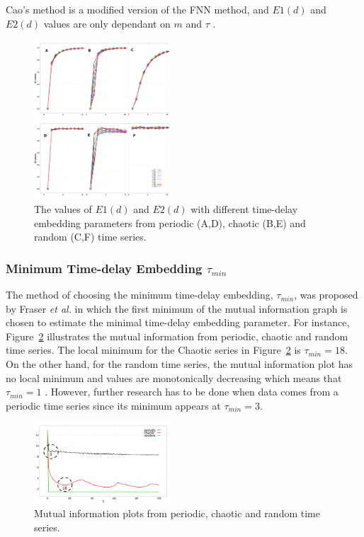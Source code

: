 \documentclass[10pt,journal,compsoc]{IEEEtran}
\begin{document}
Cao's method is a modified version of the FNN method, 
and $E1(d)$ and $E2(d)$ values are only dependant on $m$ and 
$\tau$ \cite{Cao1997}.
\begin{figure}[!htb]
\centering    
 \includegraphics[width=0.45\textwidth]{e1e2_v00}
\caption[PA]{The values of $E1(d)$ and $E2(d)$ with different time-delay 
embedding parameters from periodic (A,D), chaotic (B,E) and random (C,F) 
time series.}
\label{fig:e1e2}
\end{figure}


\subsubsection{Minimum Time-delay Embedding  $\tau_{min}$}
The method of choosing the minimum time-delay embedding, 
$\tau_{min}$, was proposed by Fraser \textit{et al.} \cite{Fraser1986} in which 
the first minimum of the mutual information graph is chosen 
to estimate the minimal time-delay embedding parameter. For 
instance, Figure~\ref{fig:mi}  illustrates the mutual information from 
periodic, chaotic and random time series.
The local minimum for the Chaotic series in Figure~\ref{fig:mi} is $\tau_{min} = 18$.
On the other hand, for the random time series, the mutual information plot has
no local minimum and values are monotonically decreasing which means that $\tau_{min} = 1$
\cite{Fraser1986}.  However, further research has to be done when
data comes from a periodic time series since its minimum appears at  $\tau_{min} = 3$.

\begin{figure}[!htb]
\centering    
 \includegraphics[width=0.45\textwidth]{mi_values_v02}
\caption[PA]{Mutual information plots from periodic, chaotic and random time series.}
\label{fig:mi}
\end{figure}
\end{document}
